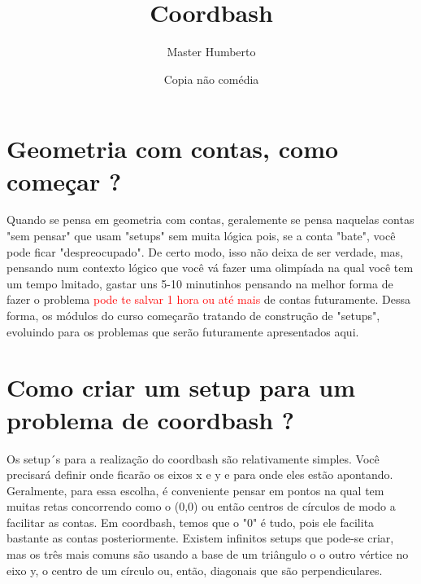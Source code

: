 \documentclass{article}
\title{Coordbash}
\author{Master Humberto}
\date{Copia não comédia}
\begin{document}
\maketitle
\tableofcontents


\section{Geometria com contas, como começar ?}

Quando se pensa em geometria com contas, geralemente se pensa naquelas contas "sem pensar" que usam "setups" sem muita lógica pois, se a conta "bate", você pode ficar "despreocupado".
De certo modo, isso não deixa de ser verdade, mas, pensando num contexto lógico que você vá fazer uma olimpíada na qual você tem um tempo lmitado, gastar uns 5-10 minutinhos pensando na melhor forma de fazer o problema \textcolor{red}{pode te salvar 1 hora ou até mais} de contas futuramente.
Dessa forma, os módulos do curso começarão tratando de construção de "setups", evoluindo para os problemas que serão futuramente apresentados aqui.

\section{Como criar um setup para um problema de coordbash ?}

Os setup´s para  a realização do coordbash são relativamente simples. Você precisará definir onde ficarão os eixos x e y e para onde eles estão apontando. Geralmente, para essa escolha, é conveniente pensar em pontos na qual tem muitas retas concorrendo como o (0,0) ou então centros de círculos de modo a facilitar as contas. Em coordbash, temos que o "0" é tudo, pois ele facilita bastante as contas posteriormente. Existem infinitos setups que pode-se criar, mas os três mais comuns são usando a base de um triângulo o o outro vértice no eixo y, o centro de um círculo ou, então, diagonais que são perpendiculares.
\begin{center}
\end{center}
\end{document}

